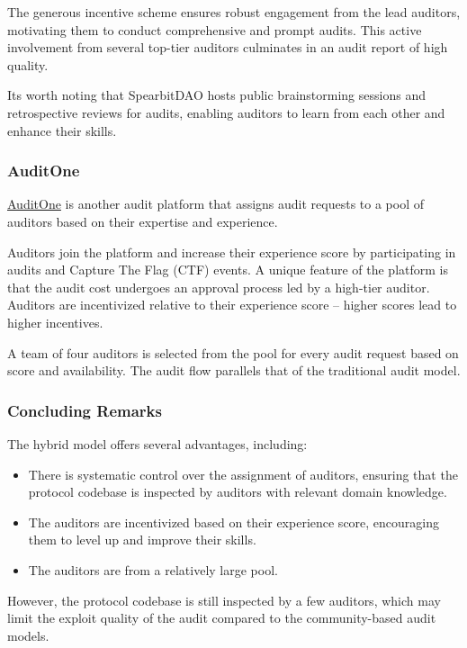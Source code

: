 \documentclass[10pt]{extarticle}
\def\tightlist{}
\begin{document}
The generous incentive scheme ensures robust engagement from the lead
auditors, motivating them to conduct comprehensive and prompt audits.
This active involvement from several top-tier auditors culminates in an
audit report of high quality.

It\textquotesingle s worth noting that SpearbitDAO hosts public
brainstorming sessions and retrospective reviews for audits, enabling
auditors to learn from each other and enhance their skills.

\subsubsection{ AuditOne}\label{322-auditone}

\href{https://auditone.io/}{AuditOne} is another audit platform that
assigns audit requests to a pool of auditors based on their expertise
and experience.

Auditors join the platform and increase their experience score by
participating in audits and Capture The Flag (CTF) events. A unique
feature of the platform is that the audit cost undergoes an approval
process led by a high-tier auditor. Auditors are incentivized relative
to their experience score -- higher scores lead to higher incentives.

A team of four auditors is selected from the pool for every audit
request based on score and availability. The audit flow parallels that
of the traditional audit model.

\subsubsection{ Concluding Remarks}\label{323-concluding-remarks}

The hybrid model offers several advantages, including:

\begin{itemize}
\tightlist
\item
  There is systematic control over the assignment of auditors, ensuring
  that the protocol codebase is inspected by auditors with relevant
  domain knowledge.
\item
  The auditors are incentivized based on their experience score,
  encouraging them to level up and improve their skills.
\item
  The auditors are from a relatively large pool.
\end{itemize}

However, the protocol codebase is still inspected by a few auditors,
which may limit the exploit quality of the audit compared to the
community-based audit models.
\end{document}
